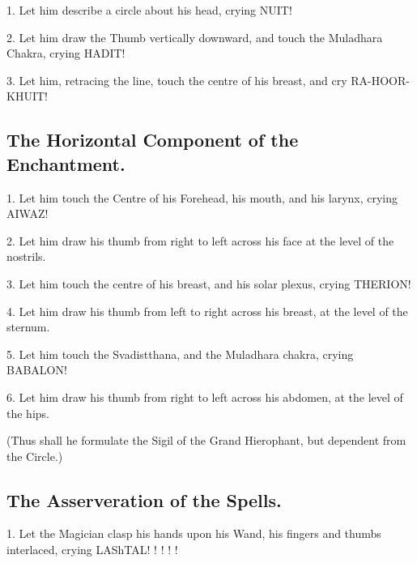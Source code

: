 1. Let him describe a circle about his head, crying NUIT!

2. Let him draw the Thumb vertically downward, and touch the Muladhara Chakra, crying HADIT!

3. Let him, retracing the line, touch the centre of his breast, and cry RA-HOOR-KHUIT!

\subsection*{The Horizontal Component of the Enchantment.}

1. Let him touch the Centre of his Forehead, his mouth, and his larynx, crying AIWAZ!

2. Let him draw his thumb from right to left across his face at the level of the nostrils.

3. Let him touch the centre of his breast, and his solar plexus, crying THERION!

4. Let him draw his thumb from left to right across his breast, at the level of the sternum.

5. Let him touch the Svadistthana, and the Muladhara chakra, crying BABALON!

6. Let him draw his thumb from right to left across his abdomen, at the level of the hips.

(Thus shall he formulate the Sigil of the Grand Hierophant, but dependent from the Circle.)

\subsection*{The Asserveration of the Spells.}

1. Let the Magician clasp his hands upon his Wand, his fingers and thumbs interlaced, crying LAShTAL! \Thelema{}! \FIAOF{}! \Agape{}! \Aumgn{}!


